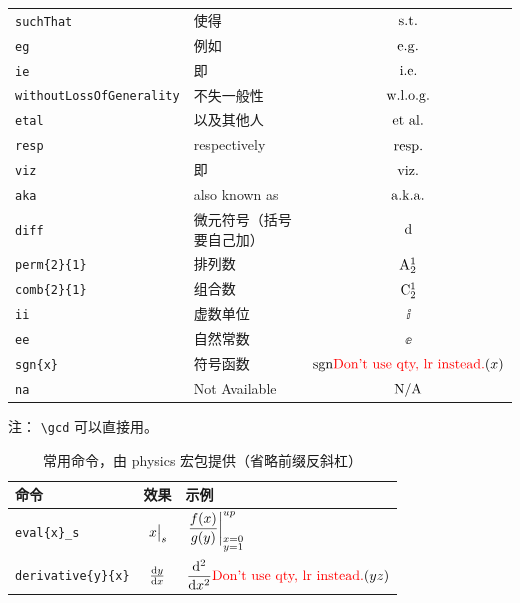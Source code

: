 \documentclass{MMCStyle}
\begin{document}
\begin{table}[!htbp]
\begin{tabularx}{0.8\textwidth}{lYc}
\lstinline|suchThat| & 使得 & $\suchThat$ \\
\lstinline|eg| & 例如 & $\eg$ \\
\lstinline|ie| & 即 & $\ie$ \\
\lstinline|withoutLossOfGenerality| & 不失一般性 & $\withoutLossOfGenerality$ \\
\lstinline|etal| & 以及其他人 & $\etal$ \\
\lstinline|resp| & respectively & $\resp$ \\
\lstinline|viz| & 即 & $\viz$ \\
\lstinline|aka| & also known as & $\aka$ \\
\lstinline|diff| & 微元符号（括号要自己加） & $\diff{}$ \\
\lstinline|perm{2}{1}| & 排列数 & $\perm{2}{1}$ \\
\lstinline|comb{2}{1}| & 组合数 & $\comb{2}{1}$ \\
\lstinline|ii| & 虚数单位 & $\ii$ \\
\lstinline|ee| & 自然常数 & $\ee$ \\
\lstinline|sgn{x}| & 符号函数 & $\sgn{x}$ \\
\lstinline|na| & Not Available & $\na$ \\
\bottomrule
\end{tabularx}
\end{table}

注： \verb|\gcd| 可以直接用。

\begin{table}
\centering
\caption{常用命令，由 physics 宏包提供（省略前缀反斜杠）}
\begin{tabularx}{0.8\textwidth}{lcY}
\toprule
\textbf{命令} & \textbf{效果} & \textbf{示例} \\
\midrule
\lstinline|eval{x}_s| & $\eval{x}_s$ & $\eval{\dfrac{f(x)}{g(y)}}_{\substack{
  x = 0 \\
  y = 1
}}^{up}$ \\
\lstinline|derivative{y}{x}| & $\derivative{y}{x}$ & $\displaystyle\dv[2]{}{x}\lr(y z)$ \\
\bottomrule
\end{tabularx}
\end{table}
\end{document}
